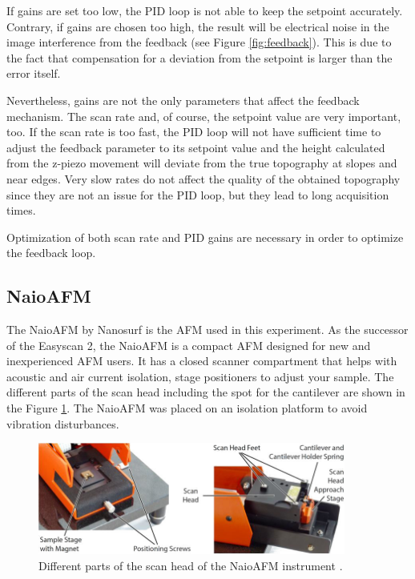 \documentclass[11pt,a4paper]{article}
\begin{document}
If gains are set too low, the PID loop is not able to keep the setpoint accurately. Contrary, if gains are chosen too high, the result will be electrical noise in the image interference from the feedback (see Figure \ref{fig:feedback}). This is due to the fact that compensation for a deviation from the setpoint is larger than the error itself.

Nevertheless, gains are not the only parameters that affect the feedback mechanism. The scan rate and, of course, the setpoint value are very important, too. If the scan rate is too fast, the PID loop will not have sufficient time to adjust the feedback parameter to its setpoint value and the height calculated from the z-piezo movement will deviate from the true topography at slopes and near edges. Very slow rates do not affect the quality of the obtained topography since they are not an issue for the PID loop, but they lead to long acquisition times.

Optimization of both scan rate and PID gains are necessary in order to optimize the feedback loop.

\subsection{NaioAFM}

The NaioAFM by Nanosurf \cite{NaioAFM} is the AFM used in this experiment. As the successor of the Easyscan 2, the NaioAFM is a compact AFM designed for new and inexperienced AFM users. It has a closed scanner compartment that helps with acoustic and air current isolation, stage positioners to adjust your sample. The different parts of the scan head including the spot for the cantilever are shown in the Figure \ref{fig:naioafm}. The NaioAFM was placed on an isolation platform to avoid vibration disturbances.

\begin{figure}[hbt]
\centering
\includegraphics[width=0.9\textwidth]{naioafm2}
\caption{Different parts of the scan head of the NaioAFM instrument \cite{NaioAFM}.}
\label{fig:naioafm}
\end{figure}
\end{document}
